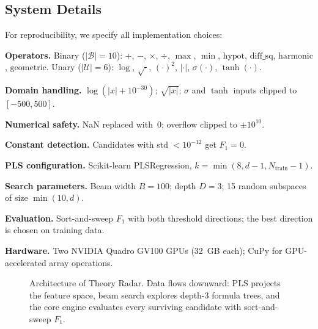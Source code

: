\documentclass[journal]{IEEEtran}
\begin{document}
\subsection{System Details}
\label{sec:system}

For reproducibility, we specify all implementation choices:

\textbf{Operators.}
Binary ($|\mathcal{B}| = 10$): $+$, $-$, $\times$, $\div$,
$\max$, $\min$, $\mathrm{hypot}$, $\mathrm{diff\_sq}$,
$\mathrm{harmonic}$, $\mathrm{geometric}$.
Unary ($|\mathcal{U}| = 6$): $\log$, $\sqrt{\cdot}$, $(\cdot)^2$,
$|\cdot|$, $\sigma(\cdot)$, $\tanh(\cdot)$.

\textbf{Domain handling.}
$\log(|x| + 10^{-30})$; $\sqrt{|x|}$; $\sigma$ and $\tanh$ inputs
clipped to $[-500, 500]$.

\textbf{Numerical safety.}
NaN replaced with~0; overflow clipped to $\pm 10^{10}$.

\textbf{Constant detection.}
Candidates with std $< 10^{-12}$ get $F_1 = 0$.

\textbf{PLS configuration.}
Scikit-learn PLSRegression,
$k = \min(8, d{-}1, N_{\mathrm{train}}{-}1)$.

\textbf{Search parameters.}
Beam width $B = 100$; depth $D = 3$; 15 random subspaces of size
$\min(10, d)$.

\textbf{Evaluation.}
Sort-and-sweep $F_1$ with both threshold directions; the best
direction is chosen on training data.

\textbf{Hardware.}
Two NVIDIA Quadro GV100 GPUs (32~GB each); CuPy for GPU-accelerated
array operations.

\begin{figure}[t]
\centering
{}
\caption{Architecture of Theory Radar.  Data flows downward:
PLS projects the feature space, beam search explores depth-3
formula trees, and the core engine evaluates every surviving
candidate with sort-and-sweep $F_1$.}
\label{fig:architecture}
\end{figure}
\end{document}
